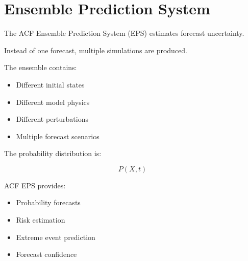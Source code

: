 \section{Ensemble Prediction System}


The ACF Ensemble Prediction System (EPS) estimates forecast
uncertainty.



Instead of one forecast, multiple simulations are produced.



The ensemble contains:


\begin{itemize}

\item Different initial states

\item Different model physics

\item Different perturbations

\item Multiple forecast scenarios

\end{itemize}



The probability distribution is:


\[
P(X,t)
\]


ACF EPS provides:


\begin{itemize}

\item Probability forecasts

\item Risk estimation

\item Extreme event prediction

\item Forecast confidence

\end{itemize}
